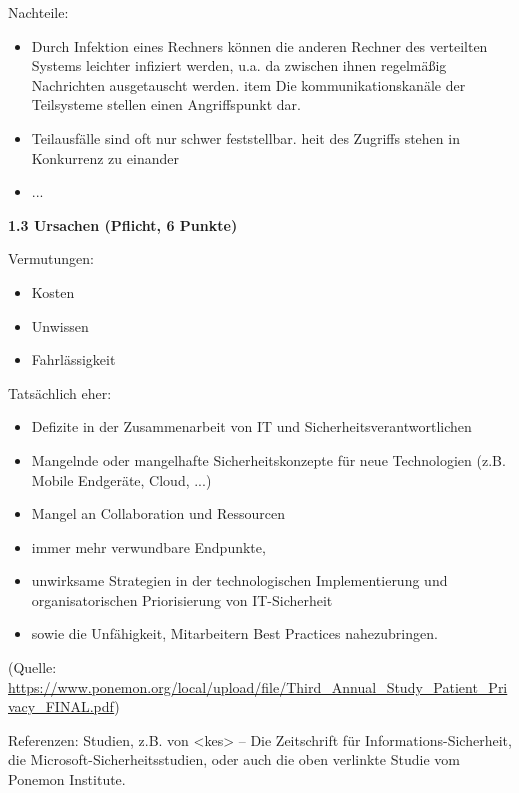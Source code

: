 \documentclass[ngerman]{fbi-aufgabenblatt}
\begin{document}
Nachteile: 
\begin{itemize}
\item Durch Infektion eines Rechners können die anderen Rechner des verteilten Systems leichter infiziert werden, u.a. da zwischen ihnen regelmäßig Nachrichten ausgetauscht werden.
                                                                                                                                                                                   item Die kommunikationskanäle der Teilsysteme stellen einen Angriffspunkt dar.
\item Teilausfälle sind oft nur schwer feststellbar.
heit des Zugriffs stehen in Konkurrenz zu einander
\item ...
\end{itemize}

\textbf{1.3 Ursachen (Pflicht, 6 Punkte)}

Vermutungen:

\begin{itemize} 
\item Kosten
\item Unwissen
\item Fahrlässigkeit
\end{itemize}

Tatsächlich eher: 

\begin{itemize} 
\item Defizite in der Zusammenarbeit von IT und Sicherheitsverantwortlichen
\item Mangelnde oder mangelhafte Sicherheitskonzepte für neue Technologien (z.B. Mobile Endgeräte, Cloud, ...)
\item Mangel an Collaboration und Ressourcen
\end{itemize}

\begin{itemize} 
\item immer mehr verwundbare Endpunkte, 
\item unwirksame Strategien in der technologischen Implementierung und organisatorischen Priorisierung von IT-Sicherheit 
\item sowie die Unfähigkeit, Mitarbeitern Best Practices nahezubringen.
\end{itemize}

(Quelle: \url{https://www.ponemon.org/local/upload/file/Third_Annual_Study_Patient_Privacy_FINAL.pdf})

Referenzen: 
Studien, z.B. von <kes> – Die Zeitschrift für Informations-Sicherheit, die Microsoft-Sicherheitsstudien, 
oder auch die oben verlinkte Studie vom Ponemon Institute.
\end{document}
